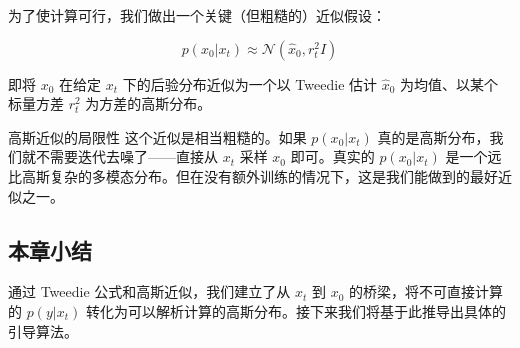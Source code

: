 为了使计算可行，我们做出一个关键（但粗糙的）近似假设：

$$
p(x_0 | x_t) \approx \mathcal{N}(\hat{x}_0, r_t^2 I)
$$

即将 $x_0$ 在给定 $x_t$ 下的后验分布近似为一个以 Tweedie 估计 $\hat{x}_0$ 为均值、以某个标量方差 $r_t^2$ 为方差的高斯分布。

\begin{warningbox}{高斯近似的局限性}
这个近似是相当粗糙的。如果 $p(x_0|x_t)$ 真的是高斯分布，我们就不需要迭代去噪了——直接从 $x_t$ 采样 $x_0$ 即可。真实的 $p(x_0|x_t)$ 是一个远比高斯复杂的多模态分布。但在没有额外训练的情况下，这是我们能做到的最好近似之一。
\end{warningbox}

\subsection{本章小结}

通过 Tweedie 公式和高斯近似，我们建立了从 $x_t$ 到 $x_0$ 的桥梁，将不可直接计算的 $p(y|x_t)$ 转化为可以解析计算的高斯分布。接下来我们将基于此推导出具体的引导算法。


